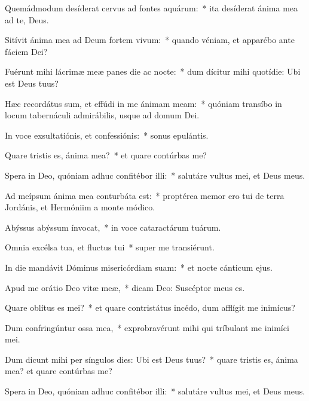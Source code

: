 \item Quemádmodum desíderat cervus ad fontes aquárum:~* ita desíderat ánima mea ad te, Deus.

\item Sitívit ánima mea ad Deum fortem vivum:~* quando véniam, et apparébo ante fáciem Dei?

\item Fuérunt mihi lácrimæ meæ panes die ac nocte:~* dum dícitur mihi quotídie: Ubi est Deus tuus?

\item Hæc recordátus sum, et effúdi in me ánimam meam:~* quóniam transíbo in locum tabernáculi admirábilis, usque ad domum Dei.

\item In voce exsultatiónis, et confessiónis:~* sonus epulántis.

\item Quare tristis es, ánima mea?~* et quare contúrbas me?

\item Spera in Deo, quóniam adhuc confitébor illi:~* salutáre vultus mei, et Deus meus.

\item Ad meípsum ánima mea conturbáta est:~* proptérea memor ero tui de terra Jordánis, et Hermóniim a monte módico.

\item Abýssus abýssum ínvocat,~* in voce cataractárum tuárum.

\item Omnia excélsa tua, et fluctus tui~* super me transiérunt.

\item In die mandávit Dóminus misericórdiam suam:~* et nocte cánticum ejus.

\item Apud me orátio Deo vitæ meæ,~* dicam Deo: Suscéptor meus es.

\item Quare oblítus es mei?~* et quare contristátus incédo, dum afflígit me inimícus?

\item Dum confringúntur ossa mea,~* exprobravérunt mihi qui tríbulant me inimíci mei.

\item Dum dicunt mihi per síngulos dies: Ubi est Deus tuus?~* quare tristis es, ánima mea? et quare contúrbas me?

\item Spera in Deo, quóniam adhuc confitébor illi:~* salutáre vultus mei, et Deus meus.
